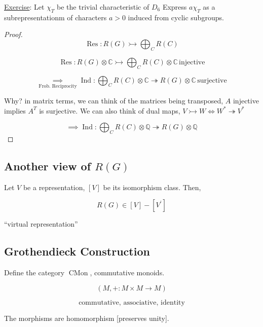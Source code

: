 \documentclass{article}
\theoremstyle{definition}
\begin{document}
\underline{Exercise}: Let \(\chi_T\) be the trivial characteristic of \(D_6\) Express \(a \chi_T\) as a subrepresentationm of characters \(a>0\) induced from cyclic subgroups.

\begin{proof}
    \[
        \operatorname{Res}: R(G) \rightarrowtail \bigoplus_{C} R(C) 
    \]

    \[
        \operatorname{Res}: R(G) \otimes \mathbb{C} \rightarrowtail \bigoplus_{C} R(C) \otimes \mathbb{C} \, \text{injective}
    \]

    \[
        \underset{\text{Frob. Reciprocity}}{\implies} \operatorname{Ind} : \bigoplus_{C} R(C) \otimes \mathbb{C} \twoheadrightarrow R(G) \otimes \mathbb{C} \, \text{surjective} 
    \]

    Why? in matrix terms, we can think of the matrices being transposed, \(A\) injective implies \(A^T\) is surjective. We can also think of dual maps, \(V \rightarrowtail W \iff W^{\ast} \twoheadrightarrow V^{\ast}\) 

    \[
        \implies \operatorname{Ind} : \bigoplus_{C} R(C) \otimes \mathbb{Q} \twoheadrightarrow R(G) \otimes \mathbb{Q}
    \]
\end{proof}

\subsection*{Another view of \(R(G)\)}

Let \(V\) be a representation, \([V]\) be its isomorphism class. Then,

\[
    R(G) \in [V] - [V^{\prime}]
\]

``virtual representation''

\subsection{Grothendieck Construction}

Define the category \(\operatorname{CMon}\), commutative monoids.

\[
    (M,+: M \times M \to M)
\]

\[
    \text{commutative, associative, identity} 
\]

The morphisms are homomorphism [preserves unity].

\begin{center}
\end{center}
\end{document}
